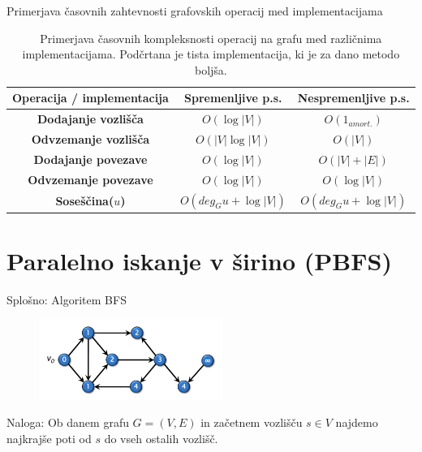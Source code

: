 \documentclass{beamer}
\begin{document}
\begin{frame}{Primerjava časovnih zahtevnosti grafovskih operacij med implementacijama}
    \begin{table}
      \centering
      \footnotesize
      \begin{tabular}{|c|c|c|}
      \hline
      \textbf{Operacija / implementacija} & \textbf{Spremenljive p.s.} & \textbf{Nespremenljive p.s.} \\ \hline
      \textbf{Dodajanje vozlišča} & $O(\log |V|)$ & \underline{$O(1_{amort.})$} \\ \hline
      \textbf{Odvzemanje vozlišča} & $O(|V| \log |V|)$ & \underline{$O(|V|)$} \\ \hline
      \textbf{Dodajanje povezave} & \underline{$O(\log |V|)$} & $O(|V| + |E|)$ \\ \hline
      \textbf{Odvzemanje povezave} & \underline{$O(\log |V|)$} & \underline{$O(\log |V|)$} \\ \hline
      \textbf{Soseščina($u$)} & \underline{$O(deg_Gu + \log |V|)$} & \underline{$O(deg_Gu + \log |V|)$} \\ \hline
      \end{tabular}
      \caption{Primerjava časovnih kompleksnosti operacij na grafu med različnima implementacijama. Podčrtana je tista 
      implementacija, ki je za dano metodo boljša.}
      \label{tab:primerjava_casovnih_kompleksnosti_operacij_na_grafu_med_razlicnima_implementacijama}
    \end{table}
    
\end{frame}
    

\section{Paralelno iskanje v širino (PBFS)}

\begin{frame}{Splošno: Algoritem BFS}
    \begin{figure}
        \centering
        \includegraphics[width=6cm]{slike/parallel_bfs/pbfs_graph_example.png}
        \label{fig:pbfs_graph_example}
    \end{figure}
    Naloga: Ob danem grafu $G=(V, E)$ in začetnem vozlišču $s \in V$ najdemo najkrajše poti od $s$ do vseh ostalih vozlišč.
\end{frame}
\end{document}
